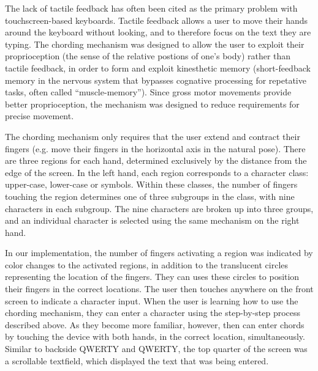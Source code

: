The lack of tactile feedback has often been cited as the primary
problem with touchscreen-based keyboards.  Tactile feedback allows a
user to move their hands around the keyboard without looking, and to
therefore focus on the text they are typing.  The chording mechanism
was designed to allow the user to exploit their proprioception (the
sense of the relative postions of one's body) rather than tactile
feedback, in order to form and exploit kinesthetic memory
(short-feedback memory in the nervous system that bypasses cognative
processing for repetative tasks, often called ``muscle-memory'').
Since gross motor movements provide better proprioception, the
mechanism was designed to reduce requirements for precise movement.

The chording mechanism only requires that the user extend and contract
their fingers (e.g. move their fingers in the horizontal axis in the
natural pose).  There are three regions for each hand, determined
exclusively by the distance from the edge of the screen.  In the left
hand, each region corresponds to a character class: upper-case,
lower-case or symbols.  Within these classes, the number of fingers
touching the region determines one of three subgroups in the class,
with nine characters in each subgroup.  The nine characters are broken
up into three groups, and an individual character is selected using
the same mechanism on the right hand.

In our implementation, the number of fingers activating a region was
indicated by color changes to the activated regions, in addition to
the translucent circles representing the location of the fingers.
They can uses these circles to position their fingers in the correct
locations.  The user then touches anywhere on the front screen to
indicate a character input.  When the user is learning how to use the
chording mechanism, they can enter a character using the step-by-step
process described above.  As they become more familiar, however, then
can enter chords by touching the device with both hands, in the
correct location, simultaneously.
Similar to backside QWERTY and QWERTY, the top quarter of the screen
was a scrollable textfield, which displayed the text that was being
entered.


